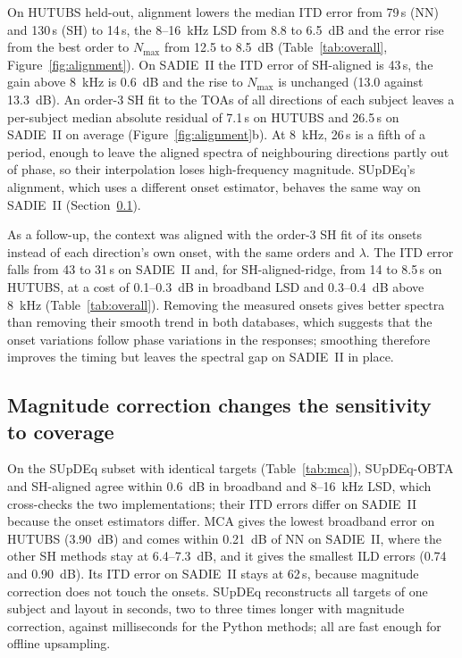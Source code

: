 \documentclass[11pt,a4paper]{article}
\newcommand{\us}{\,\textmu s}
\begin{document}
On HUTUBS held-out, alignment lowers the median ITD error from 79\us{} (NN) and 130\us{} (SH) to 14\us{}, the 8--16~kHz LSD from 8.8 to 6.5~dB and the error rise from the best order to $N_{\max}$ from 12.5 to 8.5~dB (Table~\ref{tab:overall}, Figure~\ref{fig:alignment}). On SADIE~II the ITD error of SH-aligned is 43\us, the gain above 8~kHz is 0.6~dB and the rise to $N_{\max}$ is unchanged (13.0 against 13.3~dB). An order-3 SH fit to the TOAs of all directions of each subject leaves a per-subject median absolute residual of 7.1\us{} on HUTUBS and 26.5\us{} on SADIE~II on average (Figure~\ref{fig:alignment}b). At 8~kHz, 26\us{} is a fifth of a period, enough to leave the aligned spectra of neighbouring directions partly out of phase, so their interpolation loses high-frequency magnitude. SUpDEq's alignment, which uses a different onset estimator, behaves the same way on SADIE~II (Section~\ref{sec:mca}).

As a follow-up, the context was aligned with the order-3 SH fit of its onsets instead of each direction's own onset, with the same orders and $\lambda$. The ITD error falls from 43 to 31\us{} on SADIE~II and, for SH-aligned-ridge, from 14 to 8.5\us{} on HUTUBS, at a cost of 0.1--0.3~dB in broadband LSD and 0.3--0.4~dB above 8~kHz (Table~\ref{tab:overall}). Removing the measured onsets gives better spectra than removing their smooth trend in both databases, which suggests that the onset variations follow phase variations in the responses; smoothing therefore improves the timing but leaves the spectral gap on SADIE~II in place.

\subsection{Magnitude correction changes the sensitivity to coverage}
\label{sec:mca}

On the SUpDEq subset with identical targets (Table~\ref{tab:mca}), SUpDEq-OBTA and SH-aligned agree within 0.6~dB in broadband and 8--16~kHz LSD, which cross-checks the two implementations; their ITD errors differ on SADIE~II because the onset estimators differ. MCA gives the lowest broadband error on HUTUBS (3.90~dB) and comes within 0.21~dB of NN on SADIE~II, where the other SH methods stay at 6.4--7.3~dB, and it gives the smallest ILD errors (0.74 and 0.90~dB). Its ITD error on SADIE~II stays at 62\us, because magnitude correction does not touch the onsets. SUpDEq reconstructs all targets of one subject and layout in seconds, two to three times longer with magnitude correction, against milliseconds for the Python methods; all are fast enough for offline upsampling.
\end{document}
